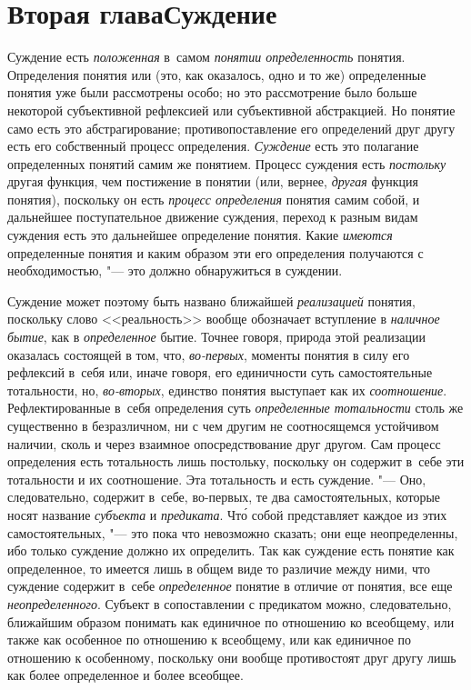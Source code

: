 \chapter[Вторая глава Суждение]{Вторая глава\newline Суждение}
Суждение есть {\em положенная} в~самом {\em понятии определенность}
понятия. Определения понятия или (это, как оказалось, одно и
то же) определенные понятия уже были рассмотрены особо; но это рассмотрение
было больше некоторой субъективной рефлексией или субъективной абстракцией.
Но понятие само есть это абстрагирование; противопоставление его
определений друг другу есть его собственный процесс определения. {\em Суждение}
есть это полагание определенных понятий самим же понятием. Процесс суждения
есть {\em постольку} другая функция, чем постижение в понятии (или, вернее,
{\em другая} функция понятия), поскольку он есть {\em процесс
определения} понятия самим собой, и дальнейшее
поступательное движение суждения, переход к разным видам
суждения есть это дальнейшее определение понятия. Какие {\em имеются}
определенные понятия и каким образом эти его определения
получаются с необходимостью, "--- это должно обнаружиться в суждении.

Суждение может поэтому быть названо ближайшей {\em реализацией}
понятия, поскольку слово <<реальность>> вообще обозначает
вступление в {\em наличное бытие}, как в {\em определенное}
бытие. Точнее говоря, природа этой реализации оказалась
состоящей в том, что, {\em во-первых},
моменты понятия в силу его рефлексий в~себя или, иначе
говоря, его единичности суть самостоятельные тотальности, но,
{\em во-вторых}, единство понятия выступает как их {\em соотношение}.
Рефлектированные в~себя определения суть {\em определенные тотальности}
столь же существенно в безразличном, ни с чем другим не
соотносящемся устойчивом наличии, сколь и через взаимное опосредствование
друг другом. Сам процесс определения есть тотальность лишь постольку,
поскольку он содержит в~себе эти тотальности и их соотношение. Эта
тотальность и есть суждение. "--- Оно, следовательно, содержит
в~себе, во-первых, те два самостоятельных, которые носят название
{\em субъекта} и {\em предиката}. Чт\'{о}
собой представляет каждое из этих самостоятельных, "--- это
пока что невозможно сказать; они еще неопределенны, ибо только суждение
должно их определить. Так как суждение есть понятие как определенное, то
имеется лишь в общем виде то различие между ними, что суждение содержит
в~себе {\em определенное} понятие в отличие от понятия, все еще
{\em неопределенного}. Субъект в сопоставлении с предикатом можно,
следовательно, ближайшим образом понимать как единичное по отношению ко
всеобщему, или также как особенное по отношению к всеобщему, или как
единичное по отношению к особенному, поскольку они вообще противостоят
друг другу лишь как более определенное и более всеобщее.

